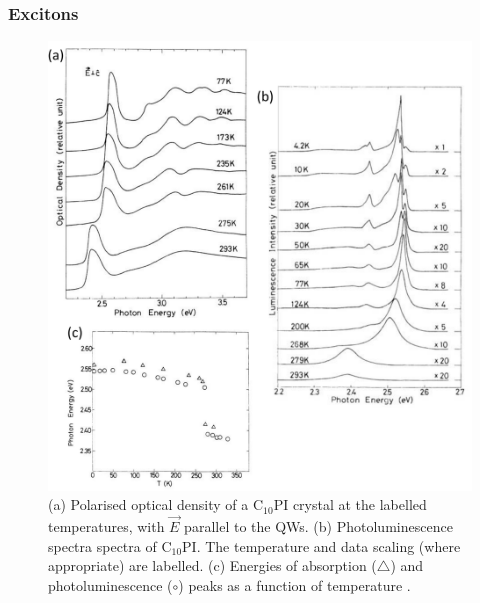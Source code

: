 \subsubsection{Excitons}
\begin{figure}[h!]
\centering
\includegraphics[width=\textwidth]{Fig13}
\caption{(a) Polarised optical density of a $\textrm{C}_{10}$PI crystal at the labelled temperatures, with $\vec{E}$ parallel to the QWs. (b) Photoluminescence spectra spectra of $\textrm{C}_{10}$PI. The temperature and data scaling (where appropriate) are labelled. (c) Energies of absorption ($\triangle$) and photoluminescence ($\circ$) peaks as a function of temperature \cite{Ishihara1990}.}
\label{2Fig13}
\end{figure}

